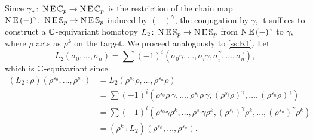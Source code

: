 Since $\gamma_\ast \colon \operatorname{N}\operatorname{E}\mathbb{C}_p \to \operatorname{N}\operatorname{E}\mathbb{C}_p$ is the restriction of the chain map $\operatorname{N}\operatorname{E}\,(-)^\gamma \colon \operatorname{N}\operatorname{E}\mathbb{S}_p \to \operatorname{N}\operatorname{E}\mathbb{S}_p$ induced by $(-)^\gamma$, the conjugation by $\gamma$, it suffices to construct a $\mathbb{C}$-equivariant homotopy $L_2 \colon \operatorname{N}\operatorname{E}\mathbb{S}_p \to \operatorname{N}\operatorname{E}\mathbb{S}_p$ from $\operatorname{N}\operatorname{E}\,(-)^\gamma$ to $\gamma$, where $\rho$ acts as $\rho^k$ on the target.
We proceed analogously to \cref{ss:K1}.
Let
\[
L_2(\sigma_0,\dots,\sigma_n) = \sum (-1)^i (\sigma_0\gamma,\dots,\sigma_i\gamma,\sigma_i^\gamma,\dots,\sigma_n^\gamma),
\]
which is $\mathbb{C}$-equivariant since
\begin{align*}
	(L_2 \comp \rho)(\rho^{s_0},\dots,\rho^{s_n}) &=
	L_2(\rho^{s_0}\rho, \dots, \rho^{s_n}\rho) \\ &=
	\sum (-1)^i (\rho^{s_0} \rho\,\gamma,\dots,\rho^{s_i} \rho\,\gamma,(\rho^{s_i} \rho)^\gamma,\dots,(\rho^{s_n} \rho)^\gamma) \\ &=
	\sum (-1)^i (\rho^{s_0} \gamma \rho^k,\dots,\rho^{s_i} \gamma \rho^k,(\rho^{s_i})^\gamma \rho^k ,\dots,(\rho^{s_n})^\gamma \rho^k) \\ &=
	(\rho^k \comp L_2)(\rho^{s_0},\dots,\rho^{s_n}).
\end{align*}